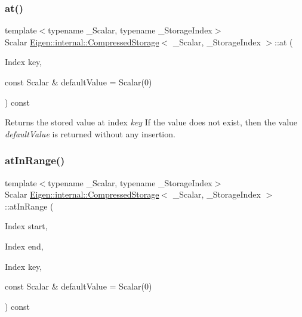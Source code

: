 \subsubsection{\texorpdfstring{at()}{at()}}
{\footnotesize\ttfamily template$<$typename \+\_\+\+Scalar, typename \+\_\+\+Storage\+Index$>$ \\
Scalar \mbox{\hyperlink{class_eigen_1_1internal_1_1_compressed_storage}{Eigen\+::internal\+::\+Compressed\+Storage}}$<$ \+\_\+\+Scalar, \+\_\+\+Storage\+Index $>$\+::at (\begin{DoxyParamCaption}\item[{Index}]{key,  }\item[{const Scalar \&}]{default\+Value = {\ttfamily Scalar(0)} }\end{DoxyParamCaption}) const\hspace{0.3cm}{\ttfamily [inline]}}

\begin{DoxyReturn}{Returns}
the stored value at index {\itshape key} If the value does not exist, then the value {\itshape default\+Value} is returned without any insertion. 
\end{DoxyReturn}
\mbox{\label{class_eigen_1_1internal_1_1_compressed_storage_a70c2745dd270aaa44b415ec2e9bf2ae0}} 
\subsubsection{\texorpdfstring{atInRange()}{atInRange()}}
{\footnotesize\ttfamily template$<$typename \+\_\+\+Scalar, typename \+\_\+\+Storage\+Index$>$ \\
Scalar \mbox{\hyperlink{class_eigen_1_1internal_1_1_compressed_storage}{Eigen\+::internal\+::\+Compressed\+Storage}}$<$ \+\_\+\+Scalar, \+\_\+\+Storage\+Index $>$\+::at\+In\+Range (\begin{DoxyParamCaption}\item[{Index}]{start,  }\item[{Index}]{end,  }\item[{Index}]{key,  }\item[{const Scalar \&}]{default\+Value = {\ttfamily Scalar(0)} }\end{DoxyParamCaption}) const\hspace{0.3cm}{\ttfamily [inline]}}

